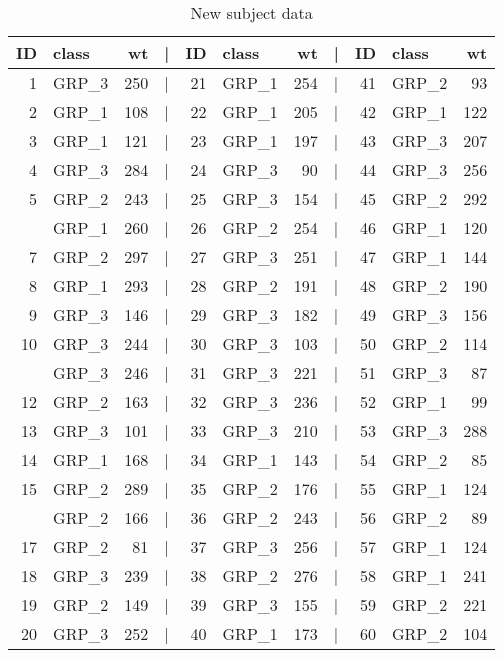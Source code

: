 \documentclass[smallextended]{svjour3}       %
\begin{document}
\begin{table}

\caption{\label{tab:new-data}New subject data}
\centering
\begin{tabular}[t]{rlrlrlrlrlr}
\toprule
ID & class & wt & | & ID & class & wt & | & ID & class & wt\\
\midrule
1 & GRP\_3 & 250 & | & 21 & GRP\_1 & 254 & | & 41 & GRP\_2 & 93\\
2 & GRP\_1 & 108 & | & 22 & GRP\_1 & 205 & | & 42 & GRP\_1 & 122\\
3 & GRP\_1 & 121 & | & 23 & GRP\_1 & 197 & | & 43 & GRP\_3 & 207\\
4 & GRP\_3 & 284 & | & 24 & GRP\_3 & 90 & | & 44 & GRP\_3 & 256\\
5 & GRP\_2 & 243 & | & 25 & GRP\_3 & 154 & | & 45 & GRP\_2 & 292\\
\addlinespace
6 & GRP\_1 & 260 & | & 26 & GRP\_2 & 254 & | & 46 & GRP\_1 & 120\\
7 & GRP\_2 & 297 & | & 27 & GRP\_3 & 251 & | & 47 & GRP\_1 & 144\\
8 & GRP\_1 & 293 & | & 28 & GRP\_2 & 191 & | & 48 & GRP\_2 & 190\\
9 & GRP\_3 & 146 & | & 29 & GRP\_3 & 182 & | & 49 & GRP\_3 & 156\\
10 & GRP\_3 & 244 & | & 30 & GRP\_3 & 103 & | & 50 & GRP\_2 & 114\\
\addlinespace
11 & GRP\_3 & 246 & | & 31 & GRP\_3 & 221 & | & 51 & GRP\_3 & 87\\
12 & GRP\_2 & 163 & | & 32 & GRP\_3 & 236 & | & 52 & GRP\_1 & 99\\
13 & GRP\_3 & 101 & | & 33 & GRP\_3 & 210 & | & 53 & GRP\_3 & 288\\
14 & GRP\_1 & 168 & | & 34 & GRP\_1 & 143 & | & 54 & GRP\_2 & 85\\
15 & GRP\_2 & 289 & | & 35 & GRP\_2 & 176 & | & 55 & GRP\_1 & 124\\
\addlinespace
16 & GRP\_2 & 166 & | & 36 & GRP\_2 & 243 & | & 56 & GRP\_2 & 89\\
17 & GRP\_2 & 81 & | & 37 & GRP\_3 & 256 & | & 57 & GRP\_1 & 124\\
18 & GRP\_3 & 239 & | & 38 & GRP\_2 & 276 & | & 58 & GRP\_1 & 241\\
19 & GRP\_2 & 149 & | & 39 & GRP\_3 & 155 & | & 59 & GRP\_2 & 221\\
20 & GRP\_3 & 252 & | & 40 & GRP\_1 & 173 & | & 60 & GRP\_2 & 104\\
\bottomrule
\end{tabular}
\end{table}
\end{document}
